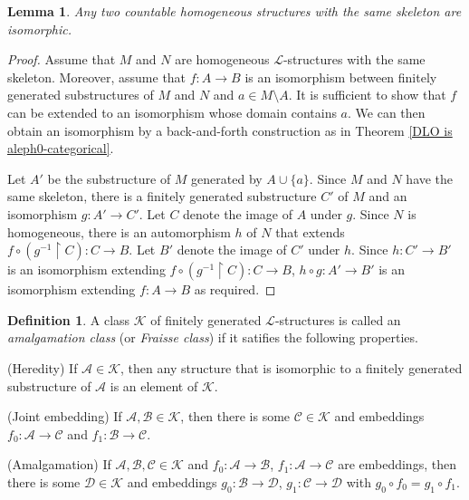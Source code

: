 \documentclass[10pt]{amsart}
\renewcommand{\L}{\mathcal{L}}
\renewcommand{\AA}{\mathcal{A}}
\newcommand{\BB}{\mathcal{B}}
\newcommand{\CC}{\mathcal{C}}
\newcommand{\DD}{\mathcal{D}}
\newcommand{\K}{\mathcal{K}}
\newtheorem{lemma}[theorem]{Lemma}
\theoremstyle{definition}
\newtheorem{definition}[theorem]{Definition}
\theoremstyle{remark}
\newenvironment{enumerate-(a)}{\begin{enumerate}[label={\upshape (\alph*)}, leftmargin=2pc]}{\end{enumerate}}
\begin{document}
\begin{lemma} \label{uniqueness homogeneous structures with the same skeleton} 
Any two countable homogeneous structures with the same skeleton are isomorphic. 
\end{lemma} 
\begin{proof} 
Assume that $M$ and $N$ are homogeneous $\L$-structures with the same skeleton. Moreover, assume that $f\colon A\rightarrow B$ is an isomorphism between finitely generated substructures of $M$ and $N$ and $a\in M\setminus A$. It is sufficient to show that $f$ can be extended to an isomorphism whose domain contains $a$. We can then obtain an isomorphism by a back-and-forth construction as in Theorem \ref{DLO is aleph0-categorical}. 

Let $A'$ be the substructure of $M$ generated by $A\cup\{a\}$.
Since $M$ and $N$ have the same skeleton, there is a finitely generated substructure $C'$ of $M$ and an isomorphism $g\colon A'\rightarrow C'$. Let $C$ denote the image of $A$ under $g$. Since $N$ is homogeneous, there is an automorphism $h$ of $N$ that extends $f\circ (g^{-1}{\upharpoonright}C)\colon C\rightarrow B$. Let $B'$ denote the image of $C'$ under $h$. Since $h\colon C'\rightarrow B'$ is an isomorphism extending $f\circ (g^{-1}{\upharpoonright}C)\colon C\rightarrow B$, $h\circ g\colon A'\rightarrow B'$ is an isomorphism extending $f\colon A\rightarrow B$ as required. 
\end{proof} 

\begin{definition} 
A class $\K$ of finitely generated $\L$-structures is called an \emph{amalgamation class} (or \emph{Fraisse class}) if it satifies the following properties. 
\begin{enumerate-(a)} 
\item 
(Heredity) If $\AA\in \K$, then any structure that is isomorphic to a finitely generated substructure of $\AA$ is an element of $\K$. 
\item 
(Joint embedding) 
If $\AA,\BB\in\K$, then there is some $\CC\in \K$ and embeddings $f_0\colon \AA\rightarrow \CC$ and $f_1\colon \BB\rightarrow\CC$. 
\item 
(Amalgamation) 
If $\AA, \BB, \CC\in\K$ and $f_0\colon \AA\rightarrow \BB$, $f_1\colon \AA\rightarrow \CC$ are embeddings, then there is some $\DD\in\K$ and embeddings $g_0\colon \BB\rightarrow \DD$, $g_1\colon \CC\rightarrow \DD$ with $g_0\circ f_0=g_1\circ f_1$. 
\end{enumerate-(a)} 
\end{definition} 
\end{document}
